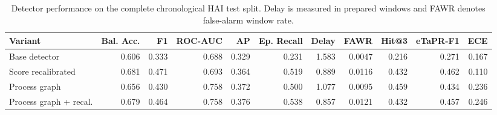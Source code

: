 \begin{table}[t]
\centering
\caption{Detector performance on the complete chronological HAI test split. Delay is measured in prepared windows and FAWR denotes false-alarm window rate.}
\label{tab:detector_variants}
\small
\setlength{\tabcolsep}{3.5pt}
\begin{tabular}{lrrrrrrrrrr}
\toprule
Variant & Bal. Acc. & F1 & ROC-AUC & AP & Ep. Recall & Delay & FAWR & Hit@3 & eTaPR-F1 & ECE \\
\midrule
Base detector & 0.606 & 0.333 & 0.688 & 0.329 & 0.231 & 1.583 & 0.0047 & 0.216 & 0.271 & 0.167 \\
Score recalibrated & 0.681 & 0.471 & 0.693 & 0.364 & 0.519 & 0.889 & 0.0116 & 0.432 & 0.462 & 0.110 \\
Process graph & 0.656 & 0.430 & 0.758 & 0.372 & 0.500 & 1.077 & 0.0095 & 0.459 & 0.434 & 0.236 \\
Process graph + recal. & 0.679 & 0.464 & 0.758 & 0.376 & 0.538 & 0.857 & 0.0121 & 0.432 & 0.457 & 0.246 \\
\bottomrule
\end{tabular}
\end{table}
